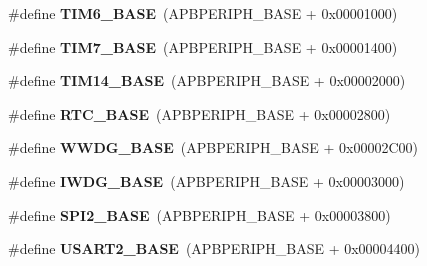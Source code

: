 \begin{DoxyCompactItemize}
\item 
\mbox{\label{group___peripheral__memory__map_ga8268ec947929f192559f28c6bf7d1eac}} 
\#define {\bfseries T\+I\+M6\+\_\+\+B\+A\+SE}~(A\+P\+B\+P\+E\+R\+I\+P\+H\+\_\+\+B\+A\+SE + 0x00001000)
\item 
\mbox{\label{group___peripheral__memory__map_ga0ebf54364c6a2be6eb19ded6b18b6387}} 
\#define {\bfseries T\+I\+M7\+\_\+\+B\+A\+SE}~(A\+P\+B\+P\+E\+R\+I\+P\+H\+\_\+\+B\+A\+SE + 0x00001400)
\item 
\mbox{\label{group___peripheral__memory__map_ga862855347d6e1d92730dfe17ee8e90b8}} 
\#define {\bfseries T\+I\+M14\+\_\+\+B\+A\+SE}~(A\+P\+B\+P\+E\+R\+I\+P\+H\+\_\+\+B\+A\+SE + 0x00002000)
\item 
\mbox{\label{group___peripheral__memory__map_ga4265e665d56225412e57a61d87417022}} 
\#define {\bfseries R\+T\+C\+\_\+\+B\+A\+SE}~(A\+P\+B\+P\+E\+R\+I\+P\+H\+\_\+\+B\+A\+SE + 0x00002800)
\item 
\mbox{\label{group___peripheral__memory__map_ga9a5bf4728ab93dea5b569f5b972cbe62}} 
\#define {\bfseries W\+W\+D\+G\+\_\+\+B\+A\+SE}~(A\+P\+B\+P\+E\+R\+I\+P\+H\+\_\+\+B\+A\+SE + 0x00002\+C00)
\item 
\mbox{\label{group___peripheral__memory__map_ga8543ee4997296af5536b007cd4748f55}} 
\#define {\bfseries I\+W\+D\+G\+\_\+\+B\+A\+SE}~(A\+P\+B\+P\+E\+R\+I\+P\+H\+\_\+\+B\+A\+SE + 0x00003000)
\item 
\mbox{\label{group___peripheral__memory__map_gac3e357b4c25106ed375fb1affab6bb86}} 
\#define {\bfseries S\+P\+I2\+\_\+\+B\+A\+SE}~(A\+P\+B\+P\+E\+R\+I\+P\+H\+\_\+\+B\+A\+SE + 0x00003800)
\item 
\mbox{\label{group___peripheral__memory__map_gade83162a04bca0b15b39018a8e8ec090}} 
\#define {\bfseries U\+S\+A\+R\+T2\+\_\+\+B\+A\+SE}~(A\+P\+B\+P\+E\+R\+I\+P\+H\+\_\+\+B\+A\+SE + 0x00004400)
\item 
\mbox{\label{group___peripheral__memory__map_gabe0d6539ac0026d598274ee7f45b0251}} 

\end{DoxyCompactItemize}
